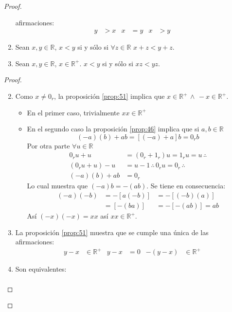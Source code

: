 \begin{proof}
\begin{proposition}
\begin{enumerate}
        afirmaciones:
        \begin{align*}
          y &> x & x &=y & x &> y
        \end{align*}
      \item Sean $x,y \in \mathbb{R}$, $x<y$ si y sólo si $\forall z \in
        \mathbb{R}$ $x +z < y + z$. 
      \item Sean $x,y \in \mathbb{R}$, $x \in \mathbb{R}^+$. $x<y$ si y sólo si
        $xz < yz$.
    \end{enumerate}
  \end{proposition}
  \begin{proof}
    \begin{enumerate}
      \setcounter{enumi}{1}
    \item Como $x\neq 0_r$, la proposición \ref{prop:51} implica que $x \in
      \mathbb{R}^+ \, \land \, -x \in \mathbb{R}^+$.
      \begin{itemize}
        \item En el primer caso, trivialmente $xx \in \mathbb{R}^+$
        \item En el segundo caso la proposición \ref{prop:46} implica que si $a,
          b \in \mathbb{R}$
          \[
            (-a)(b) + ab =[(-a) + a]b = 0_r b
          \]
          Por otra parte $\forall u \in \mathbb{R}$
          \begin{align*}
            0_r u + u &= (0_r + 1_r) u = 1_ru = u \, \therefore \\
            (0_ru + u) - u &= u-1 \, \therefore \, 0_ru = 0_r \, \therefore \\
            (-a)(b) + ab &= 0_r
          \end{align*}
          Lo cual muestra que $(-a)b = -(ab)$. Se tiene en consecuencia:
          \begin{align*}
            (-a)(-b) &= -[a(-b)] &= -[(-b)(a)] \\
                     &= [-(ba)] &= -[-(ab)] = ab
          \end{align*}
          Así $(-x)(-x) = xx$ así $xx \in \mathbb{R}^+$.
      \end{itemize}
    \item La proposición \ref{prop:51} muestra que se cumple una única de las
      afirmaciones:
      \begin{align*}
        y-x &\in \mathbb{R}^+ & y-x &= 0 & -(y-x) &\in \mathbb{R}^+
      \end{align*}
    \item Son equivalentes:
      \begin{align*}

\end{align*}
\end{enumerate}
\end{proof}
\end{proof}
